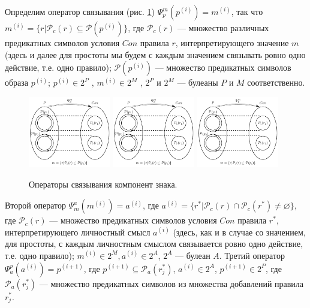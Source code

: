 \documentclass[12pt]{scrartcl}
\begin{document}
	Определим оператор связывания (рис. \ref{fig:linkers}) $\Psi_p^m(p^{(i)})=m^{(i)}$, так что $m^{(i)}=\{r|\mathcal{P}_c(r)\subseteq \mathcal{P}(p^{(i)})\}$, где $\mathcal{P}_c(r)$ --- множество различных предикатных символов условия $Con$ правила $r$, интерпретирующего значение $m$ (здесь и далее для простоты мы будем с каждым значением связывать ровно одно действие, т.е. одно правило); $\mathcal{P}(p^{(i)})$ --- множество предикатных символов образа $p^{(i)}$; $p^{(i)}\in 2^P$ , $m^{(i)}\in 2^M$ , $2^P$ и $2^M$ --- булеаны $P$ и $M$ соответственно. 
	
	\begin{figure}[H]
		\label{fig:linkers}
		\centering
		\includegraphics[width=0.32\textwidth,page=1]{sign-schemas/oper_relat}
		\includegraphics[width=0.32\textwidth,page=2]{sign-schemas/oper_relat}
		\includegraphics[width=0.32\textwidth,page=3]{sign-schemas/oper_relat}
		\caption{Операторы связывания компонент знака.}		
	\end{figure}
	
	Второй оператор	$\Psi_m^a(m^{(i)})=a^{(i)}$, где $a^{(i)}=\{r^*|\mathcal{P}_c(r)\cap \mathcal{P}_c(r^*)\not=\varnothing\}$, где $\mathcal{P}_c(r)$ --- множество предикатных символов условия $Con$ правила $r^*$, интерпретирующего личностный смысл $a^{(i)}$ (здесь, как и в случае со значением, для простоты, с каждым личностным смыслом связывается ровно одно действие, т.е. одно правило); $m^{(i)}\in 2^M, a^{(i)}\in 2^A$, $2^A$ --- булеан $A$. Третий оператор $\Psi_a^p(a^{(i)})=p^{(i+1)}$, где $p^{(i+1)}\subseteq \mathcal{P}_a(r_j^*)$, $a^{(i)}\in 2^A$, $p^{(i+1)}\in 2^P$, где $\mathcal{P}_a(r_j^*)$ --- множество предикатных символов из множества добавлений правила $r_j^*$.
	
\end{document}
